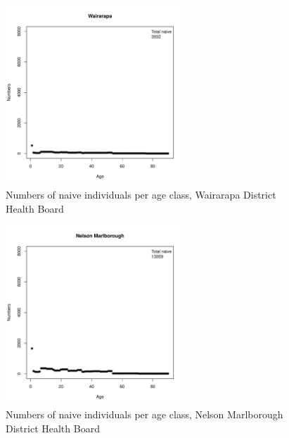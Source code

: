 \documentclass{article}
\begin{document}
\begin{figure}
     \begin{center}
     \includegraphics[width=0.6\textwidth]{dhb15.pdf}
     \end{center}
     \caption{Numbers of naive individuals per age class, Wairarapa District Health Board}
     \label{fig:Wairarapa}
\end{figure}

\begin{figure}
     \begin{center}
     \includegraphics[width=0.6\textwidth]{dhb16.pdf}
     \end{center}
     \caption{Numbers of naive individuals per age class, Nelson Marlborough District Health Board}
     \label{fig:NelsonMarlborough}
\end{figure}
\end{document}
